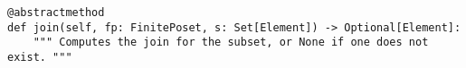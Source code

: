 \par\begin{minipage}{76ex}
\begin{verbatim}
@abstractmethod
def join(self, fp: FinitePoset, s: Set[Element]) -> Optional[Element]:
    """ Computes the join for the subset, or None if one does not exist. """
\end{verbatim}
\end{minipage}\par